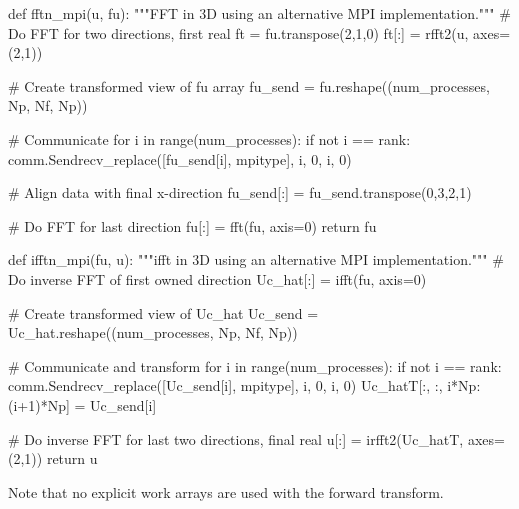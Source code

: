 \documentclass[11pt, oneside]{article}
\begin{document}
\begin{python}
def fftn_mpi(u, fu):
    """FFT in 3D using an alternative MPI implementation."""
    # Do FFT for two directions, first real
    ft = fu.transpose(2,1,0)
    ft[:] = rfft2(u, axes=(2,1))

    # Create transformed view of fu array
    fu_send = fu.reshape((num_processes, Np, Nf, Np))

    # Communicate
    for i in range(num_processes):
        if not i == rank:
            comm.Sendrecv_replace([fu_send[i], mpitype], i, 0, i, 0)

    # Align data with final x-direction
    fu_send[:] = fu_send.transpose(0,3,2,1)

    # Do FFT for last direction
    fu[:] = fft(fu, axis=0)
    return fu

def ifftn_mpi(fu, u):
    """ifft in 3D using an alternative MPI implementation."""
    # Do inverse FFT of first owned direction
    Uc_hat[:] = ifft(fu, axis=0)

    # Create transformed view of Uc_hat
    Uc_send = Uc_hat.reshape((num_processes, Np, Nf, Np))

    # Communicate and transform
    for i in range(num_processes):
       if not i == rank:
           comm.Sendrecv_replace([Uc_send[i], mpitype], i, 0, i, 0)
       Uc_hatT[:, :, i*Np:(i+1)*Np] = Uc_send[i]

    # Do inverse FFT for last two directions, final real
    u[:] = irfft2(Uc_hatT, axes=(2,1))
    return u
\end{python}
Note that no explicit work arrays are used with the forward transform.


\end{document}
